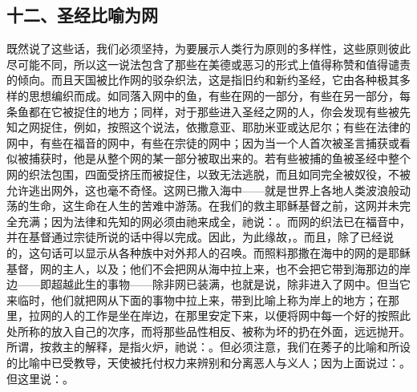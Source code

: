 
\subsection{十二、圣经比喻为网}

既然说了这些话，我们必须坚持，为要展示人类行为原则的多样性，这些原则彼此尽可能不同，所以这一说法包含了那些在美德或恶习的形式上值得称赞和值得谴责的倾向。而且天国被比作网的驳杂织法，这是指旧约和新约圣经，它由各种极其多样的思想编织而成。如同落入网中的鱼，有些在网的一部分，有些在另一部分，每条鱼都在它被捉住的地方；同样，对于那些进入圣经之网的人，你会发现有些被先知之网捉住，例如，按照这个说法，依撒意亚、耶肋米亚或达尼尔；有些在法律的网中，有些在福音的网中，有些在宗徒的网中；因为当一个人首次被圣言捕获或看似被捕获时，他是从整个网的某一部分被取出来的。若有些被捕的鱼被圣经中整个网的织法包围，四面受挤压而被捉住，以致无法逃脱，而且如同完全被奴役，不被允许逃出网外，这也毫不奇怪。这网已撒入海中——就是世界上各地人类波浪般动荡的生命，这生命在人生的苦难中游荡。在我们的救主耶稣基督之前，这网并未完全充满；因为法律和先知的网必须由祂来成全，祂说：。而网的织法已在福音中，并在基督通过宗徒所说的话中得以完成。因此，为此缘故，。而且，除了已经说的，这句话可以显示从各种族中对外邦人的召唤。而照料那撒在海中的网的是耶稣基督，网的主人，以及；他们不会把网从海中拉上来，也不会把它带到海那边的岸边——即超越此生的事物——除非网已装满，也就是说，除非进入了网中。但当它来临时，他们就把网从下面的事物中拉上来，带到比喻上称为岸上的地方；在那里，拉网的人的工作是坐在岸边，在那里安定下来，以便将网中每一个好的按照此处所称的放入自己的次序，而将那些品性相反、被称为坏的扔在外面，远远抛开。所谓，按救主的解释，是指火炉，祂说：。但必须注意，我们在莠子的比喻和所设的比喻中已受教导，天使被托付权力来辨别和分离恶人与义人；因为上面说过：。但这里说：。\par


